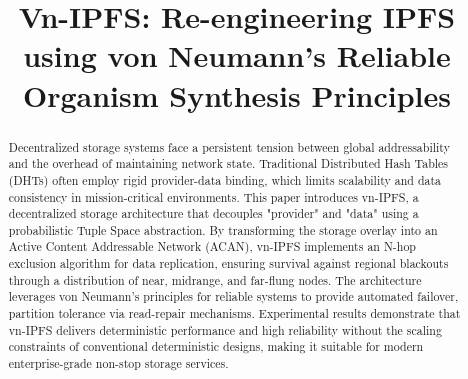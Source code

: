 \documentclass[conference]{IEEEtran}
\begin{document}
\title{Vn-IPFS: Re-engineering IPFS using von Neumann's Reliable Organism Synthesis Principles}


\maketitle

\begin{abstract}
Decentralized storage systems face a persistent tension between global addressability and the overhead of maintaining network state. Traditional Distributed Hash Tables (DHTs) often employ rigid provider-data binding, which limits scalability and data consistency in mission-critical environments. This paper introduces vn-IPFS, a decentralized storage architecture that decouples "provider" and "data" using a probabilistic Tuple Space abstraction. By transforming the storage overlay into an Active Content Addressable Network (ACAN), vn-IPFS implements an N-hop exclusion algorithm for data replication, ensuring survival against regional blackouts through a distribution of near, midrange, and far-flung nodes. The architecture leverages von Neumann’s principles for reliable systems to provide automated failover, partition tolerance via read-repair mechanisms. Experimental results demonstrate that vn-IPFS delivers deterministic performance and high reliability without the scaling constraints of conventional deterministic designs, making it suitable for modern enterprise-grade non-stop storage services.
\end{abstract}
\end{document}
